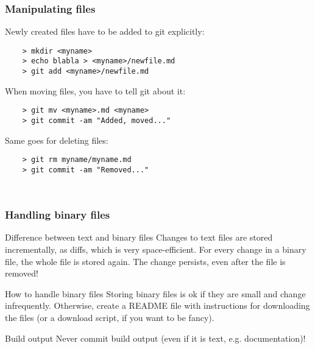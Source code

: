 \begin{frame}[fragile]
	\frametitle{Manipulating files}
	
	Newly created files have to be added to git explicitly:
	\begin{verbatim}
	> mkdir <myname>
	> echo blabla > <myname>/newfile.md
	> git add <myname>/newfile.md
	\end{verbatim}
	
	When moving files, you have to tell git about it:
	\begin{verbatim}
	> git mv <myname>.md <myname>
	> git commit -am "Added, moved..."	
	\end{verbatim}
	
	Same goes for deleting files:
	\begin{verbatim}
	> git rm myname/myname.md
	> git commit -am "Removed..."
	\end{verbatim}
	
	\begin{verbatim}
	
	\end{verbatim}
	
\end{frame}


\begin{frame}[fragile]
	\frametitle{Handling binary files}
	
	\begin{block}{Difference between text and binary files}
	Changes to text files are stored incrementally, as diffs, which is very space-efficient. For every change in a binary file, the whole file is stored again. The change persists, even after the file is removed!
	\end{block}
	
	\begin{block}{How to handle binary files}
	Storing binary files is ok if they are small and change infrequently. Otherwise, create a README file with instructions for downloading the files (or a download script, if you want to be fancy).
	\end{block}
	
	\begin{block}{Build output}
	\alert{Never} commit build output (even if it is text, e.g. documentation)!
	\end{block}
\end{frame}